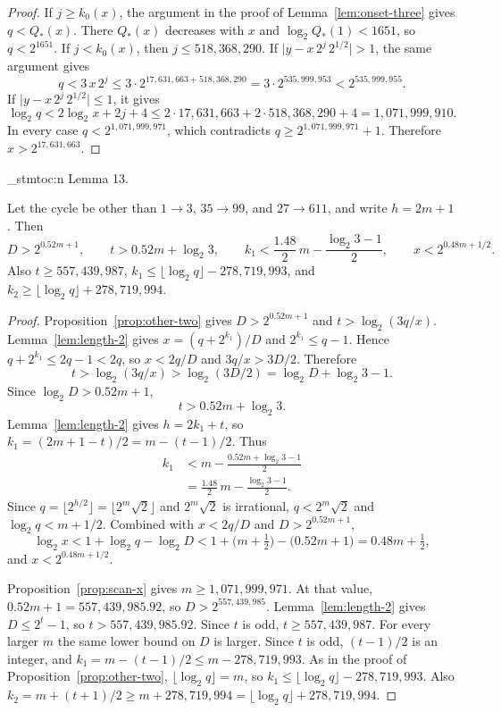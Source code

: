 \documentclass[11pt]{article}
\newenvironment{named}[1]{%
  \par\addvspace{\medskipamount}%
  \pagebreak[3]%
  \noindent{\bfseries #1}\space\ignorespaces
  \stmtoc{#1}%
}{\par\addvspace{\medskipamount}}
\newcommand{\stmtoc}[1]{ \qn_stmtoc:n {#1} }
\newcounter{lemmaref}
\newcommand{\marklemma}[2]{%
  \setcounter{lemmaref}{#1}%
  \addtocounter{lemmaref}{-1}%
  \refstepcounter{lemmaref}%
  \label{#2}%
}
\begin{document}
\begin{proof}
If $j \ge k_0(x)$, the argument in the proof of Lemma~\ref{lem:onset-three} gives $q < Q_*(x)$.
There $Q_*(x)$ decreases with $x$ and $\log_2 Q_*(1) < 1651$, so $q < 2^{1651}$.
If $j < k_0(x)$, then $j \le 518{,}368{,}290$.
If $\lvert y - x\, 2^{j}\, 2^{1/2} \rvert > 1$, the same argument gives
\[
q < 3\, x\, 2^{j} \le 3 \cdot 2^{17{,}631{,}663 + 518{,}368{,}290} = 3 \cdot 2^{535{,}999{,}953} < 2^{535{,}999{,}955}.
\]
If $\lvert y - x\, 2^{j}\, 2^{1/2} \rvert \le 1$, it gives
\[
\log_2 q < 2\log_2 x + 2j + 4 \le 2 \cdot 17{,}631{,}663 + 2 \cdot 518{,}368{,}290 + 4 = 1{,}071{,}999{,}910.
\]
In every case $q < 2^{1{,}071{,}999{,}971}$, which contradicts $q \ge 2^{1{,}071{,}999{,}971} + 1$.
Therefore $x > 2^{17{,}631{,}663}$.
\end{proof}

\begin{named}{Lemma 13.}
\marklemma{13}{lem:linear-two}
Let the cycle be other than $1 \to 3$, $35 \to 99$, and $27 \to 611$, and write $h = 2m + 1$.
Then
\[
D > 2^{0.52 m + 1},
\qquad
t > 0.52 m + \log_2 3,
\qquad
k_1 < \frac{1.48}{2}\, m - \frac{\log_2 3 - 1}{2},
\qquad
x < 2^{0.48 m + 1/2}.
\]
Also $t \ge 557{,}439{,}987$, $k_1 \le \lfloor \log_2 q \rfloor - 278{,}719{,}993$, and $k_2 \ge \lfloor \log_2 q \rfloor + 278{,}719{,}994$.
\end{named}

\begin{proof}
Proposition~\ref{prop:other-two} gives $D > 2^{0.52 m + 1}$ and $t > \log_2(3q/x)$.
Lemma~\ref{lem:length-2} gives $x = (q + 2^{k_1})/D$ and $2^{k_1} \le q - 1$.
Hence $q + 2^{k_1} \le 2q - 1 < 2q$, so $x < 2q/D$ and $3q/x > 3D/2$.
Therefore
\[
t > \log_2(3q/x) > \log_2(3D/2) = \log_2 D + \log_2 3 - 1.
\]
Since $\log_2 D > 0.52 m + 1$,
\[
t > 0.52 m + \log_2 3.
\]
Lemma~\ref{lem:length-2} gives $h = 2k_1 + t$, so $k_1 = (2m + 1 - t)/2 = m - (t - 1)/2$.
Thus
\begin{align*}
k_1
&< m - \frac{0.52 m + \log_2 3 - 1}{2} \\
&= \frac{1.48}{2}\, m - \frac{\log_2 3 - 1}{2}.
\end{align*}
Since $q = \lfloor 2^{h/2} \rfloor = \lfloor 2^m \sqrt{2} \rfloor$ and $2^m \sqrt{2}$ is irrational, $q < 2^m \sqrt{2}$ and $\log_2 q < m + 1/2$.
Combined with $x < 2q/D$ and $D > 2^{0.52 m + 1}$,
\[
\log_2 x < 1 + \log_2 q - \log_2 D < 1 + \bigl(m + \tfrac12\bigr) - \bigl(0.52 m + 1\bigr) = 0.48 m + \tfrac12,
\]
and $x < 2^{0.48 m + 1/2}$.

Proposition~\ref{prop:scan-x} gives $m \ge 1{,}071{,}999{,}971$.
At that value, $0.52 m + 1 = 557{,}439{,}985.92$, so $D > 2^{557{,}439{,}985}$.
Lemma~\ref{lem:length-2} gives $D \le 2^t - 1$, so $t > 557{,}439{,}985.92$.
Since $t$ is odd, $t \ge 557{,}439{,}987$.
For every larger $m$ the same lower bound on $D$ is larger.
Since $t$ is odd, $(t - 1)/2$ is an integer, and $k_1 = m - (t - 1)/2 \le m - 278{,}719{,}993$.
As in the proof of Proposition~\ref{prop:other-two}, $\lfloor \log_2 q \rfloor = m$, so $k_1 \le \lfloor \log_2 q \rfloor - 278{,}719{,}993$.
Also $k_2 = m + (t + 1)/2 \ge m + 278{,}719{,}994 = \lfloor \log_2 q \rfloor + 278{,}719{,}994$.
\end{proof}
\end{document}
